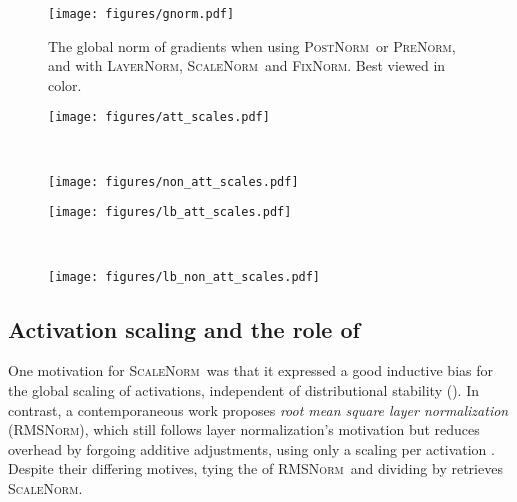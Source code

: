 \documentclass[11pt,a4paper]{article}
\newcommand{\keyword}[1]{\textit{#1}}
\newcommand{\enTOvi}{\textit{en\textrightarrow vi}}
\newcommand{\LNorm}{\textsc{LayerNorm}}
\newcommand{\SCNorm}{\textsc{ScaleNorm}}
\newcommand{\RMSNorm}{\textsc{RMSNorm}}
\newcommand{\PreNorm}{\textsc{PreNorm}}
\newcommand{\PostNorm}{\textsc{PostNorm}}
\newcommand{\fixnorm}{\textsc{FixNorm}}
\begin{document}
\begin{figure}[h!]
\centering
\texttt{[image: figures/gnorm.pdf]}
\caption{The global norm of gradients when using \PostNorm\ or \PreNorm, and with \LNorm, \SCNorm\ and \fixnorm. Best viewed in color.}
\label{fig:gnorm}
\end{figure}

\begin{figure*}[ht!]
\centering
\begin{subfigure}[b]{0.50\textwidth}
    \texttt{[image: figures/att\_scales.pdf]}
\end{subfigure}~
\begin{subfigure}[b]{0.50\textwidth}
    \texttt{[image: figures/non\_att\_scales.pdf]}
\end{subfigure}
\caption{Learned  values for \PreNorm\ + \SCNorm\ + \fixnorm\ models, versus depth. \textbf{Left:} Attention sublayers (\keyword{decoder-encoder} denotes decoder sublayers attending on the encoder). \textbf{Right:} Feedforward sublayers and the final linear layer.}
\label{fig:scales}
\end{figure*}

\begin{figure*}[ht!]
\centering
\begin{subfigure}[b]{0.50\textwidth}
    \texttt{[image: figures/lb\_att\_scales.pdf]}
\end{subfigure}~
\begin{subfigure}[b]{0.50\textwidth}
    \texttt{[image: figures/lb\_non\_att\_scales.pdf]}
\end{subfigure}
\caption{Learned  values for our \PreNorm\ + \SCNorm\ + \fixnorm\ \enTOvi\ model (with and without label smoothing), versus depth. \textbf{Left} and \textbf{Right} are the same as in .}
\label{fig:scales-ls}
\end{figure*}

\subsection{Activation scaling and the role of }
\label{ssec:g-values}

One motivation for \SCNorm\ was that it expressed a good inductive bias for the global scaling of activations, independent of distributional stability (). In contrast, a contemporaneous work \cite{Zhang2019} proposes \keyword{root mean square layer normalization} (\RMSNorm), which still follows layer normalization's motivation but reduces overhead by forgoing additive adjustments, using only a scaling  per activation . Despite their differing motives, tying the  of \RMSNorm\ and dividing by  retrieves \SCNorm.
\end{document}
